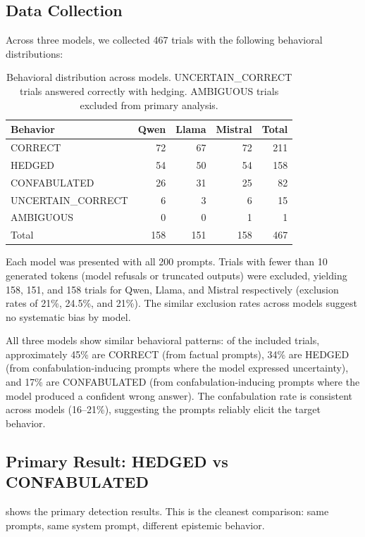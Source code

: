 \subsection{Data Collection}

Across three models, we collected 467 trials with the following behavioral
distributions:

\begin{table}[H]
\centering
\caption{Behavioral distribution across models. UNCERTAIN\_CORRECT trials
  answered correctly with hedging. AMBIGUOUS trials excluded from primary
  analysis.}
\label{tab:behavior_dist}
\begin{tabular}{lrrrr}
\toprule
Behavior & Qwen & Llama & Mistral & Total \\
\midrule
CORRECT          & 72  & 67  & 72  & 211 \\
HEDGED           & 54  & 50  & 54  & 158 \\
CONFABULATED     & 26  & 31  & 25  & 82  \\
UNCERTAIN\_CORRECT & 6 & 3   & 6   & 15  \\
AMBIGUOUS        & 0   & 0   & 1   & 1   \\
\midrule
Total            & 158 & 151 & 158 & 467 \\
\bottomrule
\end{tabular}
\end{table}

Each model was presented with all 200 prompts. Trials with fewer than
10 generated tokens (model refusals or truncated outputs) were excluded,
yielding 158, 151, and 158 trials for Qwen, Llama, and Mistral
respectively (exclusion rates of 21\%, 24.5\%, and 21\%). The similar
exclusion rates across models suggest no systematic bias by model.

All three models show similar behavioral patterns: of the included trials,
approximately 45\% are CORRECT (from factual prompts), 34\% are HEDGED
(from confabulation-inducing prompts where the model expressed
uncertainty), and 17\% are CONFABULATED (from confabulation-inducing
prompts where the model produced a confident wrong answer). The
confabulation rate is consistent across models (16--21\%), suggesting
the prompts reliably elicit the target behavior.

\subsection{Primary Result: HEDGED vs CONFABULATED}

 shows the primary detection results. This is the
cleanest comparison: same prompts, same system prompt, different
epistemic behavior.

